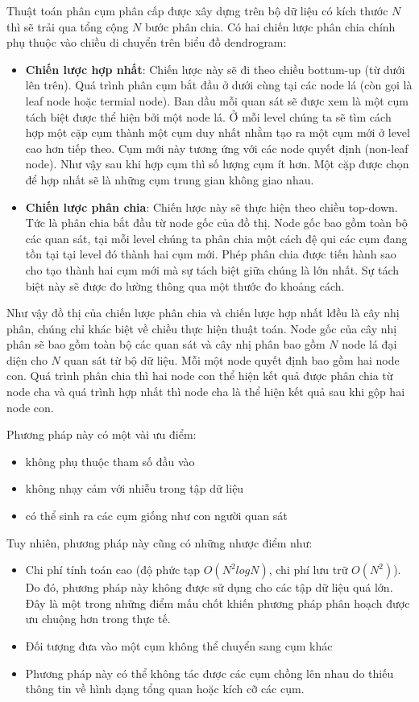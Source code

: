 \documentclass{article}
\begin{document}
    Thuật toán phân cụm phân cấp được xây dựng trên bộ dữ liệu có kích thước $N$ thì sẽ trải qua tổng cộng $N$ bước phân chia. Có hai chiến lược phân chia chính phụ thuộc vào chiều di chuyển trên biểu đồ dendrogram:
    \begin{itemize}
        \item \textbf{Chiến lược hợp nhất}: Chiến lược này sẽ đi theo chiều bottum-up (từ dưới lên trên). Quá trình phân cụm bắt đầu ở dưới cùng tại các node lá (còn gọi là leaf node hoặc termial node). Ban dầu mỗi quan sát sẽ được xem là một cụm tách biệt được thể hiện bởi một node lá. Ở mỗi level chúng ta sẽ tìm cách hợp một cặp cụm thành một cụm duy nhất nhằm tạo ra một cụm mới ở level cao hơn tiếp theo. Cụm mới này tương ứng với các node quyết định (non-leaf node). Như vậy sau khi hợp cụm thì số lượng cụm ít hơn. Một cặp được chọn để hợp nhất sẽ là những cụm trung gian không giao nhau.
        \item \textbf{Chiến lược phân chia}: Chiến lược này sẽ thực hiện theo chiều top-down. Tức là phân chia bắt đầu từ node gốc của đồ thị. Node gốc bao gồm toàn bộ các quan sát, tại mỗi level chúng ta phân chia một cách đệ qui các cụm đang tồn tại tại level đó thành hai cụm mới. Phép phân chia được tiến hành sao cho tạo thành hai cụm mới mà sự tách biệt giữa chúng là lớn nhất. Sự tách biệt này sẽ được đo lường thông qua một thước đo khoảng cách.
    \end{itemize}

    Như vậy đồ thị của chiến lược phân chia và chiến lược hợp nhất lđều là cây nhị phân, chúng chỉ khác biệt về chiều thực hiện thuật toán. Node gốc của cây nhị phân sẽ bao gồm toàn bộ các quan sát và cây nhị phân bao gồm $N$ node lá đại diện cho $N$ quan sát từ bộ dữ liệu. Mỗi một node quyết định bao gồm hai node con. Quá trình phân chia thì hai node con thể hiện kết quả được phân chia từ node cha và quá trình hợp nhất thì node cha là thể hiện kết quả sau khi gộp hai node con.

    Phương pháp này có một vài ưu điểm:
    \begin{itemize}
        \item không phụ thuộc tham số đầu vào
        \item không nhạy cảm với nhiễu trong tập dữ liệu
        \item có thể sinh ra các cụm giống như con người quan sát
    \end{itemize}

    Tuy nhiên, phương pháp này cũng có những nhược điểm như:
    \begin{itemize}
        \item Chi phí tính toán cao (độ phức tạp $O(N^2 logN)$, chi phí lưu trữ $O(N^2)$). Do đó, phương pháp này không được sử dụng cho các tập dữ liệu quá lớn. Đây là một trong những điểm mấu chốt khiến phương pháp phân hoạch được ưu chuộng hơn trong thực tế.
        \item Đối tượng đưa vào một cụm không thể chuyển sang cụm khác
        \item Phương pháp này có thể không tác được các cụm chồng lên nhau do thiếu thông tin về hình dạng tổng quan hoặc kích cỡ các cụm.
    \end{itemize}
    
\end{document}
